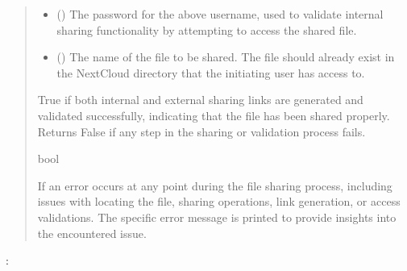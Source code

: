 \documentclass[letterpaper,10pt,english]{sphinxmanual}
\begin{document}
\begin{fulllineitems}
\begin{quote}
\begin{description}
\begin{itemize}
\item {} 
\sphinxAtStartPar
{} () \textendash{} The password for the above username, used to validate internal sharing functionality by
attempting to access the shared file.

\item {} 
\sphinxAtStartPar
{} () \textendash{} The name of the file to be shared. The file should already exist in the NextCloud directory
that the initiating user has access to.

\end{itemize}

\sphinxAtStartPar
True if both internal and external sharing links are generated and validated successfully, indicating
that the file has been shared properly. Returns False if any step in the sharing or validation process
fails.

\sphinxAtStartPar
bool

\sphinxAtStartPar
{} \textendash{} If an error occurs at any point during the file sharing process, including issues with locating
the file, sharing operations, link generation, or access validations. The specific error message
is printed to provide insights into the encountered issue.

\end{description}\end{quote}

\sphinxAtStartPar
{}:


\end{fulllineitems}
\end{document}
